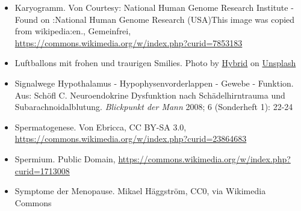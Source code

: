 \documentclass{beamer}
\begin{document}
\begin{frame}
\begin{tiny}
\begin{itemize}
\item
Karyogramm. Von Courtesy: National Human Genome Research Institute - Found on :National Human Genome Research (USA)This image was copied from wikipedia:en., Gemeinfrei, \url{https://commons.wikimedia.org/w/index.php?curid=7853183}


\item
Luftballons mit frohen und traurigen Smilies. Photo by \href{https://unsplash.com/@artbyhybrid?utm_source=unsplash&utm_medium=referral&utm_content=creditCopyText}{Hybrid} on \href{https://unsplash.com/s/photos/feedback?utm_source=unsplash&utm_medium=referral&utm_content=creditCopyText}{Unsplash}

\item
Signalwege Hypothalamus - Hypophysenvorderlappen - Gewebe - Funktion.  Aus: Schöfl C. Neuroendokrine Dysfunktion nach Schädelhirntrauma und Subarachnoidalblutung. \emph{Blickpunkt der Mann} 2008; 6 (Sonderheft 1): 22-24

\item
Spermatogenese. Von Ebricca, CC BY-SA 3.0, \url{https://commons.wikimedia.org/w/index.php?curid=23864683}

\item
Spermium. Public Domain, \url{https://commons.wikimedia.org/w/index.php?curid=1713008}

\item
Symptome der Menopause. Mikael Häggström, CC0, via Wikimedia Commons
\end{itemize}
\end{tiny}
\end{frame}
\end{document}
